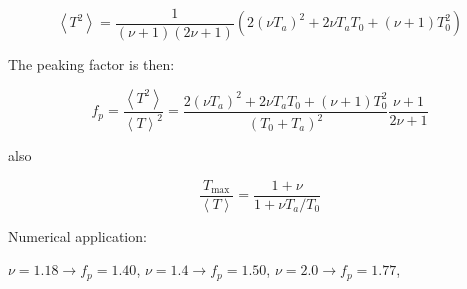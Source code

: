 \begin{equation}
    \left < T^2 \right > 
    = 
    \frac{1}{(\nu+1)(2\nu+1)}
    \left ( 
        2(\nu T_a)^2 + 2\nu T_a T_0 + (\nu + 1) T_0^2
    \right )
\end{equation}

The peaking factor is then:

\begin{equation}
    f_p
    =
    \frac{\left < T^2 \right >}{\left < T \right >^2}
    =
    \frac{2(\nu T_a)^2 + 2\nu T_a T_0 + (\nu + 1) T_0^2}{(T_0 + T_a)^2}
    \frac{\nu + 1}{2\nu + 1}
\end{equation}

also

\begin{equation}
    \frac{T_{\mathrm{max}}}{\left < T \right >}
    =
    \frac{1 + \nu}{1 + \nu T_a/T_0}
\end{equation}

Numerical application:

$\nu=1.18 \longrightarrow f_p = 1.40$, $\nu=1.4 \longrightarrow f_p = 1.50$, $\nu=2.0 \longrightarrow f_p = 1.77$, 